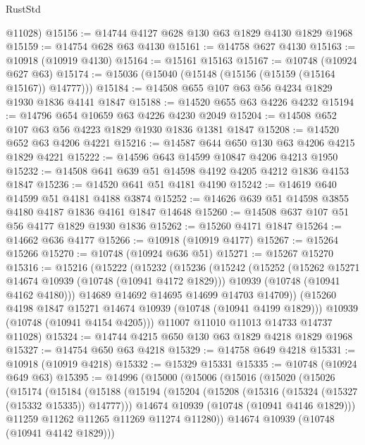 \begin{lexlean}{RustStd}
\begin{coremodule}
{\begin{coremodule}
{{{{{      @11028)
@15156 := @14744 @4127 @628 @130 @63 @1829 @4130 @1829 @1968
@15159 := @14754 @628 @63 @4130
@15161 := @14758 @627 @4130
@15163 := @10918 (@10919 @4130)
@15164 := @15161 @15163
@15167 := @10748 (@10924 @627 @63)
@15174 := @15036 (@15040 (@15148 (@15156 (@15159 (@15164 @15167)) @14777)))
@15184 := @14508 @655 @107 @63 @56 @4234 @1829 @1930 @1836 @4141 @1847
@15188 := @14520 @655 @63 @4226 @4232
@15194 := @14796 @654 @10659 @63 @4226 @4230 @2049
@15204 := @14508 @652 @107 @63 @56 @4223 @1829 @1930 @1836 @1381 @1847
@15208 := @14520 @652 @63 @4206 @4221
@15216 := @14587 @644 @650 @130 @63 @4206 @4215 @1829 @4221
@15222 := @14596 @643 @14599 @10847 @4206 @4213 @1950
@15232 := @14508 @641 @639 @51 @14598 @4192 @4205 @4212 @1836 @4153 @1847
@15236 := @14520 @641 @51 @4181 @4190
@15242 := @14619 @640 @14599 @51 @4181 @4188 @3874
@15252 := @14626 @639 @51 @14598 @3855 @4180 @4187 @1836 @4161 @1847 @14648
@15260 := @14508 @637 @107 @51 @56 @4177 @1829 @1930 @1836
@15262 := @15260 @4171 @1847
@15264 := @14662 @636 @4177
@15266 := @10918 (@10919 @4177)
@15267 := @15264 @15266
@15270 := @10748 (@10924 @636 @51)
@15271 := @15267 @15270
@15316 := @15216
    (@15222
      (@15232
        (@15236
          (@15242
            (@15252
              (@15262 @15271 @14674 @10939 (@10748 (@10941 @4172 @1829)))
              @10939
              (@10748 (@10941 @4162 @4180)))
            @14689
            @14692
            @14695
            @14699
            @14703
            @14709))
        (@15260 @4198 @1847 @15271 @14674 @10939 (@10748 (@10941 @4199 @1829)))
        @10939
        (@10748 (@10941 @4154 @4205)))
      @11007
      @11010
      @11013
      @14733
      @14737
      @11028)
@15324 := @14744 @4215 @650 @130 @63 @1829 @4218 @1829 @1968
@15327 := @14754 @650 @63 @4218
@15329 := @14758 @649 @4218
@15331 := @10918 (@10919 @4218)
@15332 := @15329 @15331
@15335 := @10748 (@10924 @649 @63)
@15395 := @14996
    (@15000
      (@15006
        (@15016
          (@15020
            (@15026
              (@15174
                (@15184
                  (@15188
                    (@15194
                      (@15204
                        (@15208 (@15316 (@15324 (@15327 (@15332 @15335)) @14777)))
                        @14674
                        @10939
                        (@10748 (@10941 @4146 @1829)))
                      @11259
                      @11262
                      @11265
                      @11269
                      @11274
                      @11280))
                  @14674
                  @10939
                  (@10748 (@10941 @4142 @1829)))
}}}}}
\end{coremodule}}
\end{coremodule}
\end{lexlean}
